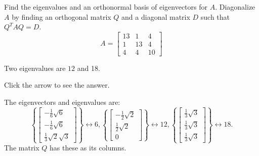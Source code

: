 \documentclass{ximera}
\begin{document}
 \begin{problem}\label{prb:9.5} Find the eigenvalues and an orthonormal basis of eigenvectors for $A.$
Diagonalize $A$ by finding an orthogonal matrix $Q$ and a diagonal matrix $D$
such that $Q^{T}AQ=D$.
\begin{equation*}
A=\left[
\begin{array}{rrr}
13 & 1 & 4 \\
1 & 13 & 4 \\
4 & 4 & 10
\end{array}
\right]
\end{equation*}

\begin{hint} Two eigenvalues are $12$ and 18.

Click the arrow to see the answer. \begin{expandable}
The eigenvectors and eigenvalues are:
\[
\left\{ \left[
\begin{array}{c}
-\frac{1}{6}\sqrt{6} \\
-\frac{1}{6}\sqrt{6} \\
\frac{1}{3}\sqrt{2}\sqrt{3}
\end{array}
\right] \right\} \leftrightarrow 6,\left\{ \left[
\begin{array}{c}
-\frac{1}{2}\sqrt{2} \\
\frac{1}{2}\sqrt{2} \\
0
\end{array}
\right] \right\} \leftrightarrow 12,\left\{ \left[
\begin{array}{c}
\frac{1}{3}\sqrt{3} \\
\frac{1}{3}\sqrt{3} \\
\frac{1}{3}\sqrt{3}
\end{array}
\right] \right\} \leftrightarrow 18.
\]
The matrix $Q$ has these as its columns.
\end{expandable} \end{hint}
\end{problem}
\end{document}
